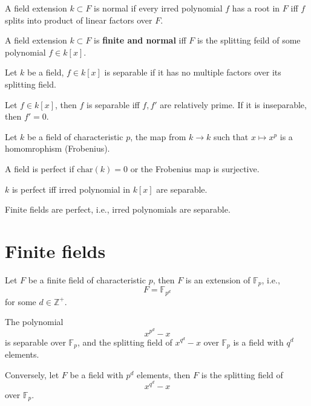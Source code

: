 \documentclass[openany]{book}
\newcommand{\Z}{\mathbb{Z}}
\newcommand{\F}{\mathbb{F}}
\begin{document}
\begin{defn}
    A field extension $k\subset F$ is normal if every irred polynomial $f$ has a root in $F$ iff $f$ splits into product of linear factors over $F$.
\end{defn}

\begin{prop}[normal]
    A field extension $k\subset F$ is \textbf{finite and normal} iff $F$ is the splitting feild of some polynomial $f\in k[x]$.
\end{prop}



\begin{defn}
    Let $k$ be a field, $f\in k[x]$ is separable if it has no multiple factors over its splitting field.
\end{defn}

\begin{prop}
    Let $f\in k[x]$, then $f$ is separable iff $f, f'$ are relatively prime. If it is inseparable, then $f'=0$.
\end{prop}



\begin{defn}
    Let $k$ be a field of characteristic $p$, the map from $k\to k$ such that $x\mapsto x^p$ is a homomrophism (Frobenius).

    A field is perfect if $\text{char}(k)=0$ or the Frobenius map is surjective.
\end{defn}

\begin{prop}
    $k$ is perfect iff irred polynomial in $k[x]$ are separable.
\end{prop}

\begin{cor}
    Finite fields are perfect, i.e., irred polynomials are separable.
\end{cor}


\section{Finite fields}
\begin{defn}
    Let $F$ be a finite field of characteristic $p$, then $F$ is an extension of $\F_{p}$, i.e., 
    \begin{equation*}
        F=\F_{p^d}
    \end{equation*}
    for some $d\in\Z^+$.
\end{defn}

\begin{thm}
    The polynomial
    \begin{equation*}
        x^{p^d}-x
    \end{equation*}
    is separable over $\F_p$, and the splitting field of $x^{q^d}-x$ over $\F_p$ is a field with $q^d$ elements. 

    Conversely, let $F$ be a field with $p^d$ elements, then $F$ is the splitting field of 
    \begin{equation*}
        x^{q^d}-x
    \end{equation*}
    over $\F_p$.
\end{thm}
\end{document}

